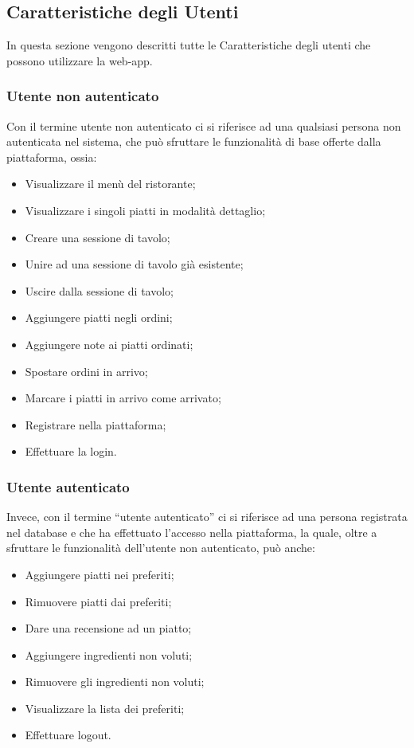 \subsection{Caratteristiche degli Utenti}
In questa sezione vengono descritti tutte le Caratteristiche degli utenti che possono utilizzare la web-app.
\subsubsection{Utente non autenticato}
Con il termine utente non autenticato ci si riferisce ad una qualsiasi persona non autenticata nel sistema, che può sfruttare le funzionalità di base offerte dalla piattaforma, ossia:
\begin{itemize}
    \item Visualizzare il menù del ristorante;
    \item Visualizzare i singoli piatti in modalità dettaglio;
    \item Creare una sessione di tavolo;
    \item Unire ad una sessione di tavolo già esistente;
    \item Uscire dalla sessione di tavolo;
    \item Aggiungere piatti negli ordini;
    \item Aggiungere note ai piatti ordinati;
    \item Spostare ordini in arrivo;
    \item Marcare i piatti in arrivo come arrivato;
    \item Registrare nella piattaforma;
    \item Effettuare la login.
\end{itemize}
\subsubsection{Utente autenticato}
Invece, con il termine “utente autenticato” ci si riferisce ad una persona registrata nel database e che ha effettuato l'accesso nella piattaforma, la quale, oltre a sfruttare le funzionalità dell'utente non autenticato, può anche:
\begin{itemize}
    \item Aggiungere piatti nei preferiti;
    \item Rimuovere piatti dai preferiti;
    \item Dare una recensione ad un piatto;
    \item Aggiungere ingredienti non voluti;
    \item Rimuovere gli ingredienti non voluti;
    \item Visualizzare la lista dei preferiti;
    \item Effettuare logout.
\end{itemize}
